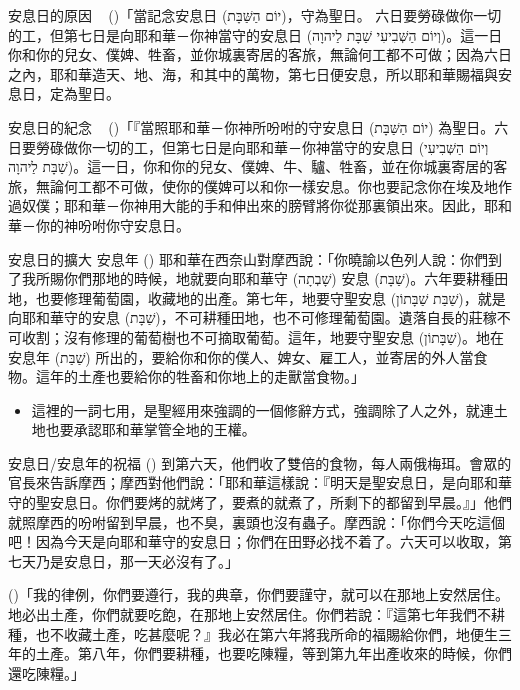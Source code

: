 \documentclass{beamer}
\newcommand{\parvspace}{\par\vspace{0.5em}}
\begin{document}
\begin{frame}{安息日的原因 \textemdash\ }
  ()「當記念安息日 (\texthebrew{יוֹם הַשַּׁבָּת})，守為聖日。 六日要勞碌做你一切的工，\alert{但第七日是向耶和華－你神當守的安息日 (\texthebrew{וְיוֹם הַשְּׁבִיעִי שַׁבָּת לַיהוָה})}。這一日你和你的兒女、僕婢、牲畜，並你城裏寄居的客旅，無論何工都不可做；因為\alert{六日之內，耶和華造天、地、海，和其中的萬物，第七日便安息，所以耶和華賜福與安息日，定為聖日}。\parvspace
\end{frame}

\begin{frame}{安息日的紀念 \textemdash\ }
  ()「『當照耶和華－你神所吩咐的守安息日 (\texthebrew{יוֹם הַשַּׁבָּת}) 為聖日。六日要勞碌做你一切的工，\alert{但第七日是向耶和華－你神當守的安息日 (\texthebrew{וְיוֹם הַשְּׁבִיעִי שַׁבָּת לַיהוָה})}。這一日，你和你的兒女、僕婢、牛、驢、牲畜，並在你城裏寄居的客旅，無論何工都不可做，使你的僕婢可以和你一樣安息。\alert{你也要記念你在埃及地作過奴僕；耶和華－你神用大能的手和伸出來的膀臂將你從那裏領出來。因此，耶和華－你的神吩咐你守安息日}。\parvspace
\end{frame}

\begin{frame}{安息日的擴大 \textemdash 安息年}
  () 耶和華在西奈山對摩西說：「你曉諭以色列人說：你們到了我所賜你們那地的時候，地就要向耶和華\alert{守 (\texthebrew{שָׁבְתָה}) 安息 (\texthebrew{שַׁבָּת})}。六年要耕種田地，也要修理葡萄園，收藏地的出產。第七年，地要守\alert{聖安息 (\texthebrew{שַׁבַּת שַׁבָּתוֹן})}，就是向耶和華守的\alert{安息 (\texthebrew{שַׁבָּת})}，不可耕種田地，也不可修理葡萄園。遺落自長的莊稼不可收割；沒有修理的葡萄樹也不可摘取葡萄。這年，地要守\alert{聖安息 (\texthebrew{שַׁבָּתוֹן})}。地在\alert{安息年 (\texthebrew{שַׁבַּת})} 所出的，要給你和你的僕人、婢女、雇工人，並寄居的外人當食物。這年的土產也要給你的牲畜和你地上的走獸當食物。」\parvspace
  \begin{itemize}
    \item
      這裡的\alert{一詞七用}，是聖經用來強調的一個修辭方式，強調\alert{除了人之外，就連土地也要承認耶和華掌管全地的王權}。\parencite{安息年}
  \end{itemize}
\end{frame}

\begin{frame}{安息日/安息年的祝福}
  () \alert{到第六天，他們收了雙倍的食物，每人兩俄梅珥}。會眾的官長來告訴摩西；摩西對他們說：「耶和華這樣說：『明天是聖安息日，是向耶和華守的聖安息日。你們要烤的就烤了，要煮的就煮了，所剩下的都留到早晨。』」他們就照摩西的吩咐留到早晨，也不臭，裏頭也沒有蟲子。摩西說：「你們今天吃這個吧！因為今天是向耶和華守的安息日；你們在田野必找不着了。六天可以收取，第七天乃是安息日，那一天必沒有了。」\parvspace
  ()「我的律例，你們要遵行，我的典章，你們要謹守，就可以在那地上安然居住。地必出土產，你們就要吃飽，在那地上安然居住。你們若說：『這第七年我們不耕種，也不收藏土產，吃甚麼呢？』\alert{我必在第六年將我所命的福賜給你們，地便生三年的土產}。第八年，你們要耕種，也要吃陳糧，等到第九年出產收來的時候，你們還吃陳糧。」\parvspace
\end{frame}
\end{document}
